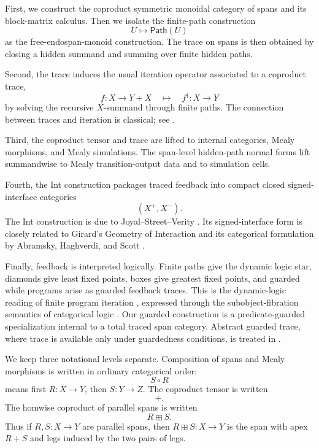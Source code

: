 First, we construct the coproduct symmetric monoidal category of spans and its
block-matrix calculus. Then we isolate the finite-path construction
\[
  U\longmapsto \mathsf{Path}(U)
\]
as the free-endospan-monoid construction. The trace on spans is then obtained
by closing a hidden summand and summing over finite hidden paths.

Second, the trace induces the usual iteration operator associated to a
coproduct trace,
\[
  f:X\to Y+X
  \quad\mapsto\quad
  f^\dagger:X\to Y
\]
by solving the recursive \(X\)-summand through finite paths. The connection
between traces and iteration is classical; see
\cite{BloomEsik1993IterationTheories,Hasegawa1997RecursionCyclicSharing,Hasegawa2004Uniformity}.

Third, the coproduct tensor and trace are lifted to internal categories,
Mealy morphisms, and Mealy simulations. The span-level hidden-path normal
forms lift summandwise to Mealy transition-output data and to simulation
cells.

Fourth, the Int construction packages traced feedback into compact closed
signed-interface categories
\[
  (X^+,X^-).
\]
The Int construction is due to Joyal--Street--Verity
\cite{JoyalStreetVerity1996TracedMonoidalCategories}. Its signed-interface
form is closely related to Girard's Geometry of Interaction and its
categorical formulation by Abramsky, Haghverdi, and Scott
\cite{Girard1989GeometryInteractionI,Girard1989TowardsGeometryInteraction,AbramskyHaghverdiScott2002GeometryInteractionLCA}.

Finally, feedback is interpreted logically. Finite paths give the dynamic
logic star, diamonds give least fixed points, boxes give greatest fixed
points, and guarded while programs arise as guarded feedback traces. This is
the dynamic-logic reading of finite program iteration
\cite{HarelKozenTiurynDynamicLogic}, expressed through the subobject-fibration
semantics of categorical logic
\cite{Jacobs1999CategoricalLogic}. Our guarded construction is a
predicate-guarded specialization internal to a total traced span category.
Abstract guarded trace, where trace is available only under guardedness
conditions, is treated in
\cite{GoncharovSchroder2018GuardedTracedCategories}.

We keep three notational levels separate. Composition of spans and Mealy
morphisms is written in ordinary categorical order:
\[
  S\circ R
\]
means first \(R:X\to Y\), then \(S:Y\to Z\). The coproduct tensor is written
\[
  +.
\]
The homwise coproduct of parallel spans is written
\[
  R\boxplus S.
\]
Thus if \(R,S:X\to Y\) are parallel spans, then
\(R\boxplus S:X\to Y\) is the span with apex \(R+S\) and legs induced by the
two pairs of legs.

